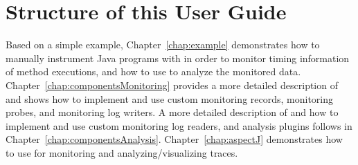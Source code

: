 \section{Structure of this User Guide}

Based on a simple example, Chapter~\ref{chap:example} demonstrates %
how to manually instrument Java programs with \KiekerMonitoringPart{} %
in order to monitor timing information of method executions, and %
how to use \KiekerAnalysisPart{} to analyze the monitored data. %
Chapter~\ref{chap:componentsMonitoring} provides a more detailed %
description of \KiekerMonitoringPart{} and shows how to implement and %
use custom monitoring records, monitoring probes, and monitoring log writers. %
A more detailed description of \KiekerAnalysisPart{} and how to implement and use %
custom monitoring log readers, and analysis plugins follows in %
Chapter~\ref{chap:componentsAnalysis}. %
Chapter~\ref{chap:aspectJ} demonstrates how to use \KiekerTraceAnalysis{} %
for monitoring and analyzing/visualizing traces. %

\quad\\


